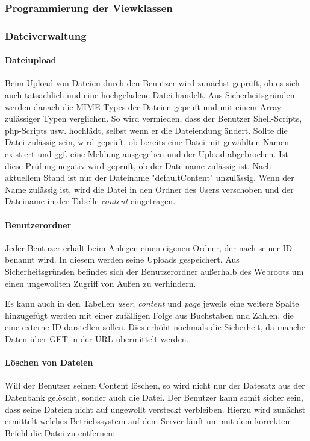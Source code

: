 \documentclass[10pt]{scrarticle}
\begin{document}
\subsubsection{Programmierung der Viewklassen}
\subsubsection{Dateiverwaltung}



\paragraph{Dateiupload}

Beim Upload von Dateien durch den Benutzer wird zunächst geprüft, ob es sich auch tatsächlich und eine hochgeladene Datei handelt. Aus Sicherheitsgründen werden danach die MIME-Types der Dateien geprüft und mit einem Array zulässiger Typen verglichen. So wird vermieden, dass der Benutzer Shell-Scripts, php-Scripts usw. hochlädt, selbst wenn er die Dateiendung ändert. Sollte die Datei zulässig sein, wird geprüft, ob bereits eine Datei mit gewählten Namen existiert und ggf. eine Meldung ausgegeben und der Upload abgebrochen. Ist diese Prüfung negativ wird geprüft, ob der Dateiname zulässig ist. Nach aktuellem Stand ist nur der Dateiname "defaultContent" unzulässig. Wenn der Name zulässig ist, wird die Datei in den Ordner des Users verschoben und der Dateiname in der Tabelle \textit{content} eingetragen.

\paragraph{Benutzerordner}

Jeder Bentuzer erhält beim Anlegen einen eigenen Ordner, der nach seiner ID benannt wird. In diesem werden seine Uploads gespeichert. Aus Sicherheitsgründen befindet sich der Benutzerordner außerhalb des Webroots um einen ungewollten Zugriff von Außen zu verhindern.

\begin{infobox}[Alternative:]
Es kann auch in den Tabellen \textit{user}, \textit{content} und \textit{page} jeweils eine weitere Spalte hinzugefügt werden mit einer zufälligen Folge aus Buchstaben und Zahlen, die eine externe ID darstellen sollen. Dies erhöht nochmals die Sicherheit, da manche Daten über GET in der URL übermittelt werden.
\end{infobox}

\paragraph{Löschen von Dateien}
Will der Benutzer seinen Content löschen, so wird nicht nur der Datesatz aus der Datenbank gelöscht, sonder auch die Datei. Der Benutzer kann somit sicher sein, dass seine Dateien nicht auf ungewollt versteckt verbleiben. Hierzu wird zunächst ermittelt welches Betriebssystem auf dem Server läuft um mit dem korrekten Befehl die Datei zu entfernen:
\end{document}
